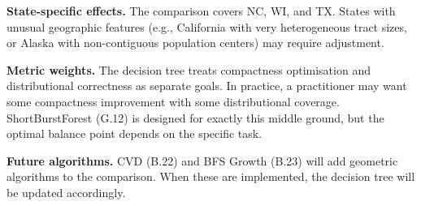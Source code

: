 \textbf{State-specific effects.}
The comparison covers NC, WI, and TX.
States with unusual geographic features (e.g., California with very
heterogeneous tract sizes, or Alaska with non-contiguous population
centers) may require adjustment.

\textbf{Metric weights.}
The decision tree treats compactness optimisation and distributional
correctness as separate goals.
In practice, a practitioner may want some compactness improvement with
some distributional coverage.
ShortBurstForest (G.12) is designed for exactly this middle ground, but
the optimal balance point depends on the specific task.

\textbf{Future algorithms.}
CVD (B.22) and BFS Growth (B.23) will add geometric algorithms to the
comparison.
When these are implemented, the decision tree will be updated accordingly.
